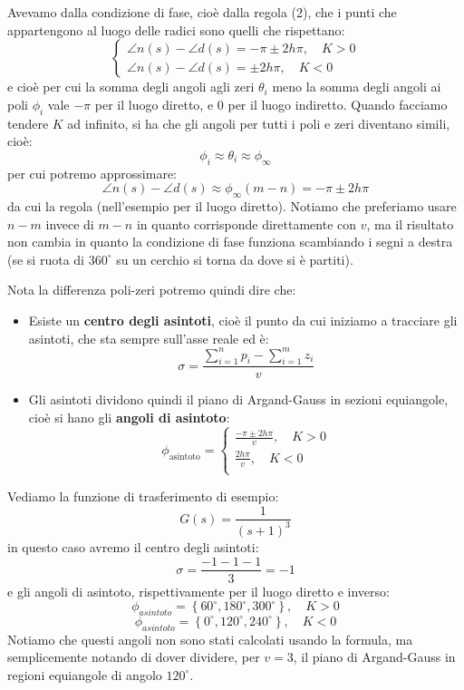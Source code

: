 \documentclass[a4paper,11pt]{article}
\begin{document}
\begin{enumerate}
		Avevamo dalla condizione di fase, cioè dalla regola (2), che i punti che appartengono al luogo delle radici sono quelli che rispettano:
		\[
			\begin{cases}
				\angle n(s) - \angle d(s) = -\pi \pm 2 h \pi, \quad K > 0 \\
				\angle n(s) - \angle d(s) = \pm 2 h \pi, \quad K < 0
			\end{cases}
		\]
		e cioè per cui la somma degli angoli agli zeri $\theta_i$ meno la somma degli angoli ai poli $\phi_i$ vale $-\pi$ per il luogo diretto, e $0$ per il luogo indiretto.
		Quando facciamo tendere $K$ ad infinito, si ha che gli angoli per tutti i poli e zeri diventano simili, cioè:
		$$
		\phi_i \approx \theta_i \approx \phi_\infty
		$$
		per cui potremo approssimare:
		$$
		\angle n(s) - \angle d(s) \approx \phi_{\infty} (m - n) = -\pi \pm 2 h \pi
		$$
		da cui la regola (nell'esempio per il luogo diretto).
		Notiamo che preferiamo usare $n - m$ invece di $m - n$ in quanto corrisponde direttamente con $v$, ma il risultato non cambia in quanto la condizione di fase funziona scambiando i segni a destra (se si ruota di $360^\circ$ su un cerchio si torna da dove si è partiti).

		Nota la differenza poli-zeri potremo quindi dire che:
		\begin{itemize}
			\item Esiste un \textbf{centro degli asintoti}, cioè il punto da cui iniziamo a tracciare gli asintoti, che sta sempre sull'asse reale ed è:
				$$
				\sigma = \frac{ \sum_{i = 1}^n p_i - \sum_{i = 1}^m z_i }{v}
				$$

			\item Gli asintoti dividono quindi il piano di Argand-Gauss in sezioni equiangole, cioè si hano gli \textbf{angoli di asintoto}:
				\[
					\phi_\text{asintoto} =
					\begin{cases}
						\frac{-\pi \pm 2 h \pi}{v}, \quad K > 0 \\
						\frac{2 h \pi}{v}, \quad K < 0 \\
					\end{cases}
				\]
		\end{itemize}

		\par\medskip
		\noindent
		\textbf{}

		Vediamo la funzione di trasferimento di esempio:
		$$
		G(s) = \frac{1}{(s + 1)^3}
		$$
		in questo caso avremo il centro degli asintoti:
		$$
		\sigma = \frac{-1 -1 -1}{3} = -1
		$$
		e gli angoli di asintoto, rispettivamente per il luogo diretto e inverso:
		$$
		\phi_{asintoto} = \left\{ 60^\circ, 180^\circ, 300^\circ \right\}, \quad K > 0
		$$
		$$
		\phi_{asintoto} = \left\{ 0^\circ, 120^\circ, 240^\circ \right\}, \quad K < 0
		$$
		Notiamo che questi angoli non sono stati calcolati usando la formula, ma semplicemente notando di dover dividere, per $v = 3$, il piano di Argand-Gauss in regioni equiangole di angolo $120^\circ$.


\end{enumerate}
\end{document}
